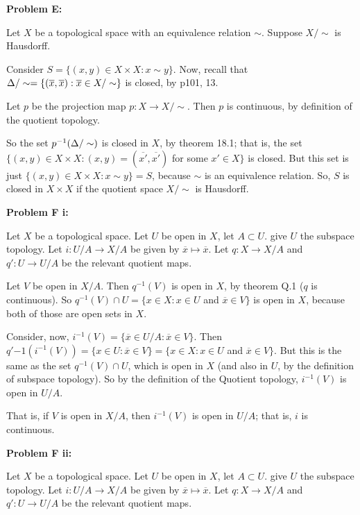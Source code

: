 \documentclass[a4paper,12pt]{article}
\begin{document}
\shunt

{\bf Problem E:}

Let $X$ be a topological space with an equivalence relation $\sim$. Suppose $X/\sim$ is Hausdorff.

Consider $S = \{(x,y) \in X \times X : x \sim y\}$. Now, recall that $\Delta/\sim = \{(\overline{x},\overline{x}): \overline{x} \in X/\sim\}$ is closed, by p101, 13.

Let $p$ be the projection map $p: X \to X/\sim$. Then $p$ is continuous, by definition of the quotient topology.

So the set $p^{-1}(\Delta/\sim)$ is closed in $X$, by theorem 18.1; that is, the set $\{(x,y) \in X \times X : (x,y) = (\overline{x'},\overline{x'})$ for some $x' \in X\}$ is closed. But this set is just $\{(x,y) \in X \times X: x\sim y\}=S$, because $\sim$ is an equivalence relation. So, $S$ is closed in $X \times X$ if the quotient space $X/\sim$ is Hausdorff.

\shunt

{\bf Problem F i:}

Let $X$ be a topological space. Let $U$ be open in $X$, let $A \subset U$. give $U$ the subspace topology. Let $i: U/A \to X/A$ be given by $\overline{x} \mapsto \overline{x}$.  Let $q: X \to X/A$ and $q': U \to U/A$ be the relevant quotient maps.

Let $V$ be open in $X/A$. Then $q^{-1}(V)$ is open in $X$, by theorem Q.1 ($q$ is continuous). So $q^{-1}(V) \cap U = \{x \in X: x \in U $ and $\overline{x} \in V\}$ is open in $X$, because both of those are open sets in $X$.

Consider, now, $i^{-1}(V) = \{\overline{x} \in U/A: \overline{x} \in V\}$. Then $q'{-1}(i^{-1}(V)) = \{x \in U: \overline{x} \in V\} = \{x \in X: x \in U $ and $ \overline{x} \in V\}$. But this is the same as the set $q^{-1}(V) \cap U$, which is open in $X$ (and also in $U$, by the definition of subspace topology). So by the definition of the Quotient topology, $i^{-1}(V)$ is open in $U/A$.

That is, if $V$ is open in $X/A$, then $i^{-1}(V)$ is open in $U/A$; that is, $i$ is continuous.

\shunt

{\bf Problem F ii:}

Let $X$ be a topological space. Let $U$ be open in $X$, let $A \subset U$. give $U$ the subspace topology. Let $i: U/A \to X/A$ be given by $\overline{x} \mapsto \overline{x}$.  Let $q: X \to X/A$ and $q': U \to U/A$ be the relevant quotient maps.
\end{document}
